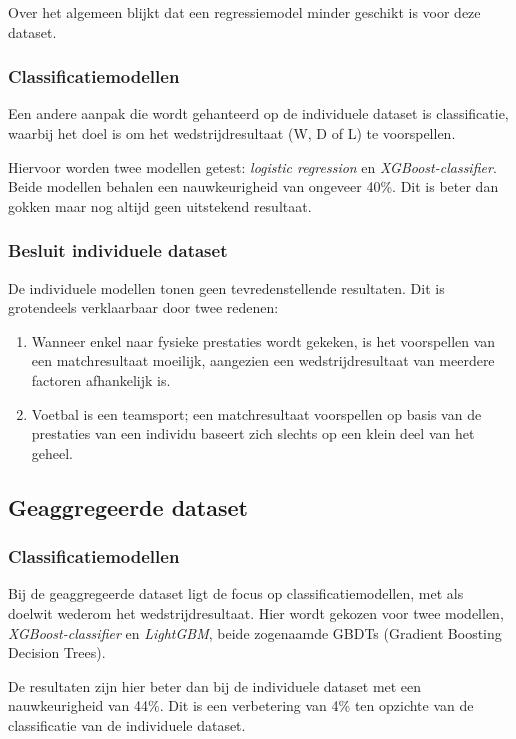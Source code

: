 Over het algemeen blijkt dat een regressiemodel minder geschikt is voor deze dataset.

\subsubsection{Classificatiemodellen}

Een andere aanpak die wordt gehanteerd op de individuele dataset is classificatie, waarbij het doel is om het wedstrijdresultaat (W, D of L) te voorspellen.

Hiervoor worden twee modellen getest: \emph{logistic regression} en \emph{XGBoost-classifier}. Beide modellen behalen een nauwkeurigheid van ongeveer 40\%. Dit is beter dan gokken maar nog altijd geen uitstekend resultaat.

\subsubsection{Besluit individuele dataset}

De individuele modellen tonen geen tevredenstellende resultaten. Dit is grotendeels verklaarbaar door twee redenen:
\begin{enumerate}
\item Wanneer enkel naar fysieke prestaties wordt gekeken, is het voorspellen van een matchresultaat moeilijk, aangezien een wedstrijdresultaat van meerdere factoren afhankelijk is.
\item Voetbal is een teamsport; een matchresultaat voorspellen op basis van de prestaties van een individu baseert zich slechts op een klein deel van het geheel.
\end{enumerate}

\subsection{Geaggregeerde dataset}
\subsubsection{Classificatiemodellen}

Bij de geaggregeerde dataset ligt de focus op classificatiemodellen, met als doelwit wederom het wedstrijdresultaat. Hier wordt gekozen voor twee modellen, \emph{XGBoost-classifier} en \emph{LightGBM}, beide zogenaamde GBDTs (Gradient Boosting Decision Trees).

De resultaten zijn hier beter dan bij de individuele dataset met een nauwkeurigheid van 44\%. Dit is een verbetering van 4\% ten opzichte van de classificatie van de individuele dataset.

